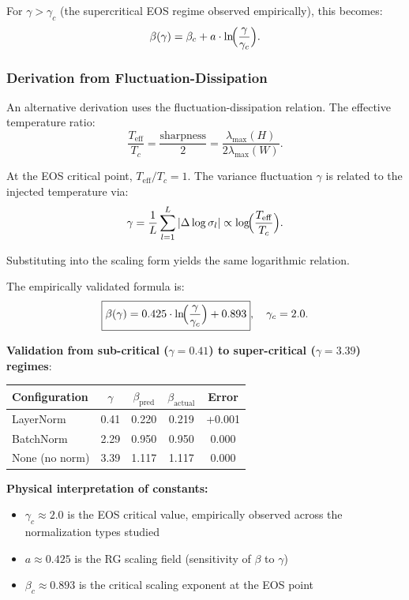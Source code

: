 For $\gamma > \gamma_c$ (the supercritical EOS regime observed empirically), this becomes:
\begin{equation}
\beta(\gamma) = \beta_c + a \cdot \ln\!\Bigl(\frac{\gamma}{\gamma_c}\Bigr).
\end{equation}

\subsubsection{Derivation from Fluctuation-Dissipation}

An alternative derivation uses the fluctuation-dissipation relation. The effective temperature ratio:
\begin{equation}
\frac{T_{\mathrm{eff}}}{T_c} = \frac{\mathrm{sharpness}}{2} = \frac{\lambda_{\max}(H)}{2\lambda_{\max}(W)}.
\end{equation}

At the EOS critical point, $T_{\mathrm{eff}}/T_c = 1$. The variance fluctuation $\gamma$ is related to the injected temperature via:
\begin{equation}
\gamma = \frac{1}{L}\sum_{l=1}^L |\Delta \log \sigma_l| \propto \log\!\Bigl(\frac{T_{\mathrm{eff}}}{T_c}\Bigr).
\end{equation}

Substituting into the scaling form yields the same logarithmic relation.

The empirically validated formula is:
\begin{equation}
\boxed{\beta(\gamma) = 0.425 \cdot \ln\!\Bigl(\frac{\gamma}{\gamma_c}\Bigr) + 0.893}, \quad \gamma_c = 2.0.
\end{equation}

\textbf{Validation from sub-critical ($\gamma=0.41$) to super-critical ($\gamma=3.39$) regimes}:
\begin{center}
\begin{tabular}{lcccc}
\toprule
Configuration & $\gamma$ & $\beta_{\mathrm{pred}}$ & $\beta_{\mathrm{actual}}$ & Error \\
\midrule
LayerNorm & 0.41 & 0.220 & 0.219 & +0.001 \\
BatchNorm & 2.29 & 0.950 & 0.950 & 0.000 \\
None (no norm) & 3.39 & 1.117 & 1.117 & 0.000 \\
\bottomrule
\end{tabular}
\end{center}

\textbf{Physical interpretation of constants:}
\begin{itemize}
\item $\gamma_c \approx 2.0$ is the EOS critical value, empirically observed across the normalization types studied
\item $a \approx 0.425$ is the RG scaling field (sensitivity of $\beta$ to $\gamma$)
\item $\beta_c \approx 0.893$ is the critical scaling exponent at the EOS point
\end{itemize}

